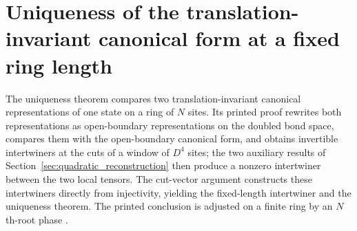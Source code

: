 


\section{Uniqueness of the translation-invariant canonical form at a fixed ring length}%
\label{sec:pgvwc07_ti_uniqueness}

The uniqueness theorem \cite[Theorem~7]{PerezGarcia2007Matrix} compares two
translation-invariant canonical representations of one state on a ring of
$N$ sites. Its printed proof rewrites both representations as open-boundary
representations on the doubled bond space, compares them with the
open-boundary canonical form, and obtains invertible intertwiners at the
cuts of a window of $D^4$ sites; the two auxiliary results of
Section~\ref{sec:quadratic_reconstruction} then produce a nonzero
intertwiner between the two local tensors. The cut-vector argument constructs
these intertwiners directly from injectivity, yielding the fixed-length
intertwiner and the uniqueness theorem. The printed conclusion is adjusted
on a finite ring by an $N$th-root phase
\cite{gap:pgvwc07_quadratic_reconstruction_phase, gap:pgvwc07_ti_uniqueness_scope}.

